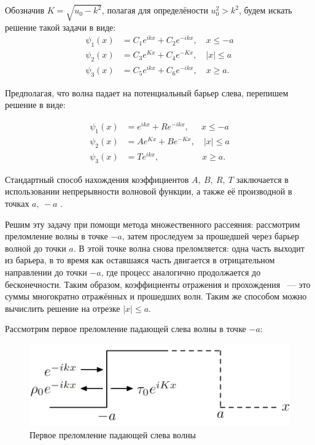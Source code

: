 \documentclass[a4 paper, 12 pt]{extarticle}
\begin{document}
   Обозначив $K = \sqrt{u_0-k^2}$, полагая для определёности $u_0^2 > k^2$, будем искать решение такой задачи в виде:
   \[\begin{split}
   \psi_1\left(x\right) &= C_1 e^{ikx} + C_2 e^{-ikx}, \quad x\leq -a\\
   \psi_2\left(x\right) &= C_3 e^{Kx} + C_4 e^{-Kx}, \quad \left|x\right|\leq a\\
   \psi_3\left(x\right) &= C_5 e^{ikx} + C_6 e^{-ikx}, \quad x \geq a.
   \end{split}\]

   Предполагая, что волна падает на потенциальный барьер слева, перепишем решение в виде:

   \[\begin{split}
   \psi_1\left(x\right) &= e^{ikx} + R e^{-ikx}, \quad \ \ x\leq -a\\
   \psi_2\left(x\right) &= Ae^{Kx} + B e^{-Kx}, \quad \left|x\right|\leq a\\
   \psi_3\left(x\right) &= T e^{ikx}, \quad \quad \quad \quad \quad x \geq a.
   \end{split}\]

   Стандартный способ нахождения коэффициентов $A,\  B, \  R,\  T$  заключается в использовании непрерывности волновой функции, а также её производной в точках $a, \ -a$ \cite{Peisakhovich}.

   Решим эту задачу при помощи метода множественного рассеяния: рассмотрим преломление волны в точке $-a$, затем проследуем за прошедшей через барьер волной до точки $a$. В этой точке волна снова преломляется: одна часть выходит из барьера, в то время как оставшаяся часть двигается в отрицательном направлении до точки $-a$, где процесс аналогично продолжается до бесконечности. Таким образом, коэффициенты отражения и прохождения ~--- это суммы многократно отражённых и прошедших волн. Таким же способом можно вычислить решение на отрезке $\left|x\right|\leq a$.

   Рассмотрим первое преломление падающей слева волны в точке $-a$:
   
   \begin{figure}[!htb]
   	\centering
   	\includegraphics[scale=0.25]{reflect1.jpg}
   	\caption{Первое преломление падающей слева волны}
   \end{figure}
\end{document}
